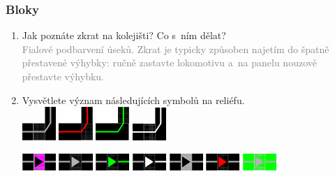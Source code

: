\documentclass[12pt,a4paper]{article}
\newcommand{\solution}[1]{\\ \textcolor{gray}{#1}}
\newcommand{\solution}[1]{}
\begin{document}
\subsubsection*{Bloky}
\begin{enumerate}[leftmargin=*]
\item Jak poznáte zkrat na kolejišti? Co s~ním dělat?
\solution{Fialové podbarvení úseků. Zkrat je typicky způsoben najetím do špatně
přestavené výhybky: ručně zastavte lokomotivu a~na panelu nouzově přestavte
výhybku.}

\item Vysvětlete význam následujících symbolů na reliéfu. \\
\includegraphics[width=0.1\textwidth]{symboly/kol1.png}
\includegraphics[width=0.1\textwidth]{symboly/kol2.png}
\includegraphics[width=0.1\textwidth]{symboly/kol3.png}
\includegraphics[width=0.1\textwidth]{symboly/kol4.png}

\includegraphics[width=0.1\textwidth]{symboly/hlnav16.png}
\includegraphics[width=0.1\textwidth]{symboly/hlnav1.png}
\includegraphics[width=0.1\textwidth]{symboly/hlnav2.png}
\includegraphics[width=0.1\textwidth]{symboly/hlnav3.png}
\includegraphics[width=0.1\textwidth]{symboly/hlnav5.png}
\includegraphics[width=0.1\textwidth]{symboly/hlnav6.png}
\includegraphics[width=0.1\textwidth]{symboly/hlnav8.png}


\end{enumerate}
\end{document}
